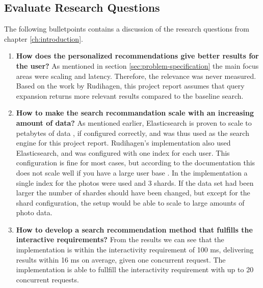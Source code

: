 \subsection{Evaluate Research Questions}
The following bulletpoints contains a discussion of the research questions from chapter \ref{ch:introduction}.

\begin{enumerate}
  \item \textbf{How does the personalized recommendations give better results for the user?} \newline
  As mentioned in section \ref{sec:problem-specification} the main focus areas were scaling and latency.
  Therefore, the relevance was never measured.
  Based on the work by Rudihagen,
  this project report assumes that query expansion returns more relevant results compared to the baseline search.

  \item\label{rq:scaling} \textbf{How to make the search recommandation scale with an increasing amount of data?} \newline
  As mentioned earlier, Elasticsearch is proven to scale to petabytes of data \cite{elasticsearch-scale},
  if configured correctly, and was thus used as the search engine for this project report.
  Rudihagen's implementation also used Elasticsearch, and was configured with one index for each user.
  This configuration is fine for most cases, but according to the documentation this does not scale well if you have a large user base \cite{elasticsearch-indices}.
  In the implementation a single index for the photos were used and 3 shards.
  If the data set had been larger the number of shardes should have been changed,
  but except for the shard configuration, the setup would be able to scale to large amounts of photo data.

  \item\label{rq:latency} \textbf{How to develop a search recommendation method that fulfills the interactive requirements?} \newline
  From the results we can see that the implementation is within the interactivity requirement of 100 ms, delivering results within 16 ms on average, given one concurrent request.
  The implementation is able to fullfill the interactivity requirement with up to 20 concurrent requests.
\end{enumerate}
